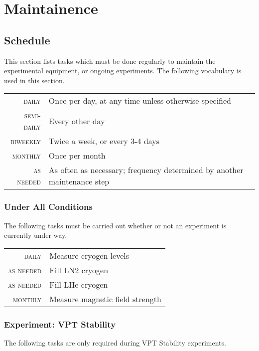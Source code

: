 \chapter{Maintainence}

\section{Schedule}
\label{sec:op_maintenance}

This section lists tasks which must be done regularly to maintain the experimental equipment, or ongoing experiments.  The following vocabulary is used in this section.
\begin{table}[h]\begin{tabular}{>{\scshape}r p{\textwidth}}
    daily & Once per day, at any time unless otherwise specified\\
    semi-daily & Every other day\\
    biweekly & Twice a week, or every 3-4 days\\
    monthly & Once per month\\
    as needed & As often as necessary; frequency determined by another maintenance step\\
\end{tabular}\end{table}

\subsection{Under All Conditions}
\label{sec:op_maintenance:always}
The following tasks must be carried out whether or not an experiment is currently under way.  

\begin{table}[h]\begin{tabular}{>{\scshape}r p{\textwidth}}
    daily & Measure cryogen levels\\
    as needed & Fill LN2 cryogen\\
    as needed & Fill LHe cryogen\\
    monthly & Measure magnetic field strength    
\end{tabular}\end{table}

\subsection{Experiment: VPT Stability}
\label{sec:op_maintenance:ex_vpt_stability}
The following tasks are only required during VPT Stability experiments.

